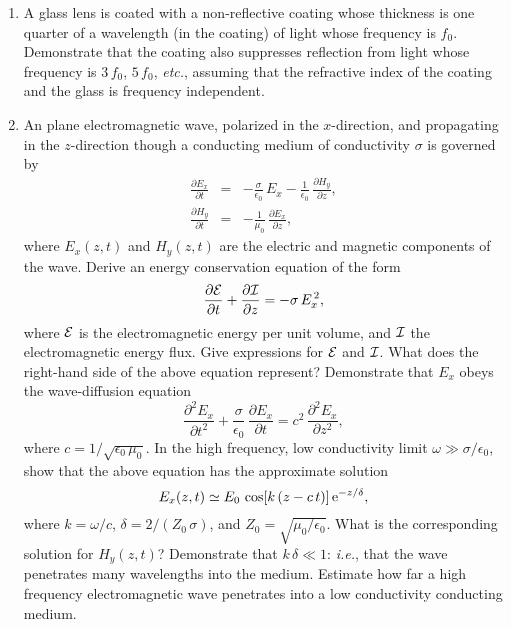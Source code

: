 {\begin{enumerate}
\item A glass lens is coated with a non-reflective coating whose thickness is one quarter of
a wavelength (in the coating) of light whose frequency is $f_0$. Demonstrate that the
coating also suppresses reflection from light whose frequency is $3\,f_0$, $5\,f_0$, {\em etc.}, assuming that the
refractive index of the coating and the glass is frequency independent.

\item An plane electromagnetic wave, polarized in the $x$-direction, and propagating in the $z$-direction though a
conducting medium of conductivity $\sigma$ is governed by
\begin{eqnarray}
\frac{\partial E_x}{\partial t} &=&-\frac{\sigma}{\epsilon_0}\,E_x -\frac{1}{\epsilon_0}\,\frac{\partial H_y}{\partial z},\nonumber\\[0.5ex]
\frac{\partial H_y}{\partial t} &=& - \frac{1}{\mu_0}\,\frac{\partial E_x}{\partial z}\nonumber,
\end{eqnarray}
where $E_x(z,t)$ and $H_y(z,t)$ are the electric and magnetic components
of the wave.
Derive an energy conservation equation of the form
$$
\frac{\partial{\cal E}}{\partial t} + \frac{\partial {\cal I}}{\partial z} =- \sigma\,E_x^{\,2},
$$
where ${\cal E}$ is the electromagnetic energy per unit volume, and ${\cal I}$ the electromagnetic energy flux. 
Give expressions for ${\cal E}$ and ${\cal I}$. What does the right-hand side of the
above equation represent? Demonstrate that $E_x$ obeys the wave-diffusion
equation
$$
\frac{\partial^2 E_x}{\partial t^2} + \frac{\sigma}{\epsilon_0}\,\frac{\partial E_x}{\partial t}= c^2\,\frac{\partial^2 E_x}{\partial z^2},
$$
where $c=1/\sqrt{\epsilon_0\,\mu_0}$. In the high frequency, low conductivity limit
$\omega\gg \sigma/\epsilon_0$, show that the above equation has the approximate solution
$$
E_x(z,t)\simeq E_0\,\cos[k\,(z-c\,t)]\,{\rm e}^{-z/\delta},
$$
where $k=\omega/c$, $\delta = 2/(Z_0\,\sigma)$, and $Z_0=\sqrt{\mu_0/\epsilon_0}$. 
What is the corresponding solution for $H_y(z,t)$? Demonstrate that $k\,\delta \ll 1$: {\em i.e.}, that the wave penetrates many wavelengths into the medium.
Estimate how far a high frequency electromagnetic wave penetrates into a low conductivity conducting medium.
\end{enumerate}}
